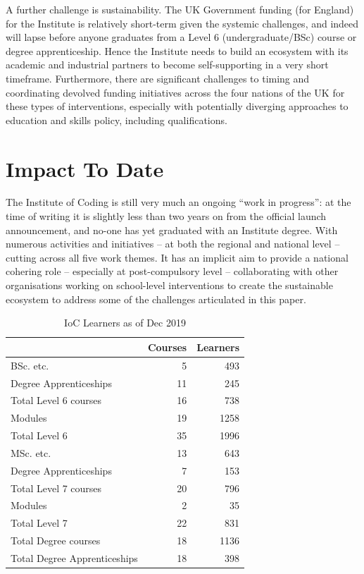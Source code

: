 \documentclass[conference]{IEEEtran}
\begin{document}
A further challenge is sustainability. The UK Government funding (for
England) for the Institute is relatively short-term given the systemic
challenges, and indeed will lapse before anyone graduates from a Level
6 (undergraduate/BSc) course or degree apprenticeship. Hence the
Institute needs to build an ecosystem with its academic and industrial
partners to become self-supporting in a very short
timeframe. Furthermore, there are significant challenges to timing and
coordinating devolved funding initiatives across the four nations of
the UK for these types of interventions, especially with potentially
diverging approaches to education and skills policy, including qualifications.

\section{Impact To Date}\label{impact}

The Institute of Coding is still very much an ongoing ``work in
progress'': at the time of writing it is slightly less than two years
on from the official launch announcement, and no-one has yet graduated
with an Institute degree.  With numerous activities and initiatives --
at both the regional and national level -- cutting across all five
work themes. It has an implicit aim to provide a national cohering
role -- especially at post-compulsory level -- collaborating with
other organisations working on school-level interventions to create
the sustainable ecosystem to address some of the challenges
articulated in this paper.

\begin{table}
  \begin{center}
\caption{IoC Learners as of Dec 2019\label{tab:data}}
\begin{tabular}{lrr}
  &Courses&Learners\\
    \hline
	BSc. etc.&5&493\\
	Degree Apprenticeships&11&245\\
	Total Level 6 courses&16&738\\
	Modules&19&1258\\
	Total Level 6&35&1996\\
	MSc. etc.&13&643\\
	Degree Apprenticeships&7&153\\
	Total Level 7 courses&20&796\\
	Modules&2&35\\
	Total Level 7&22&831\\
Total Degree courses&18&1136\\
  Total Degree Apprenticeships&18&398\\
                                       \hline
\end{tabular}
\end{center}
\end{table}
\end{document}
